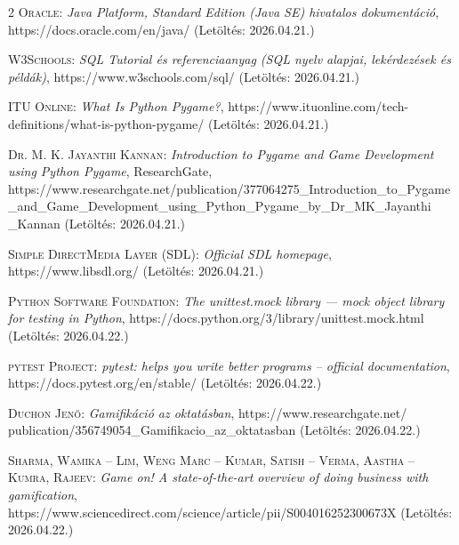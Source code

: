 \documentclass[]{thesis-ekf}
\begin{document}
\begin{thebibliography}{2}
		\textsc{Oracle}: \emph{Java Platform, Standard Edition (Java SE) hivatalos dokumentáció}, https://docs.oracle.com/en/java/ (Letöltés: 2026.04.21.)
		
		\textsc{W3Schools}: \emph{SQL Tutorial és referenciaanyag (SQL nyelv alapjai, lekérdezések és példák)}, https://www.w3schools.com/sql/ (Letöltés: 2026.04.21.)
		
		\textsc{ITU Online}: \emph{What Is Python Pygame?}, https://www.ituonline.com/tech-definitions/what-is-python-pygame/ (Letöltés: 2026.04.21.)
		
		
		\textsc{Dr. M. K. Jayanthi Kannan}: \emph{Introduction to Pygame and Game Development using Python Pygame}, ResearchGate, https://www.researchgate.net/publication/377064275\_Introduction\_to\_Pygame\\\_and\_Game\_Development\_using\_Python\_Pygame\_by\_Dr\_MK\_Jayanthi\\\_Kannan (Letöltés: 2026.04.21.)
		
		\textsc{Simple DirectMedia Layer (SDL)}: \emph{Official SDL homepage}, https://www.libsdl.org/ (Letöltés: 2026.04.21.)
		
		\textsc{Python Software Foundation}: \emph{The unittest.mock library — mock object library for testing in Python}, https://docs.python.org/3/library/unittest.mock.html (Letöltés: 2026.04.22.)
		
		\textsc{pytest Project}: \emph{pytest: helps you write better programs – official documentation}, https://docs.pytest.org/en/stable/ (Letöltés: 2026.04.22.)
		
		\textsc{Duchon Jenő}: \emph{Gamifikáció az oktatásban}, https://www.researchgate.net/\\publication/356749054\_Gamifikacio\_az\_oktatasban (Letöltés: 2026.04.22.)
		 
		\textsc{Sharma, Wamika – Lim, Weng Marc – Kumar, Satish – Verma, Aastha – Kumra, Rajeev}: \emph{Game on! A state-of-the-art overview of doing business with gamification}, https://www.sciencedirect.com/science/article/pii/S004016252300673X (Letöltés: 2026.04.22.)
		
	\end{thebibliography}
	
	 
	
\end{document}
